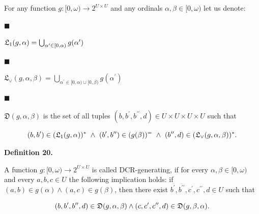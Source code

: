  
 
For any function $g:[0,\omega)\to 2^{U\times U}$ and any ordinals $\alpha,\beta\in[0,\omega)$ let us denote:\par
  
\par\noindent  $\blacksquare$ 
 
$\mathfrak{L}_{1}(g,\alpha)=\bigcup_{\alpha^{\prime}\in[0,\alpha)}g(\alpha^{%
\prime})$\par
 
 
 
\par\noindent  $\blacksquare$ 
 
$\mathfrak{L}_{\vee}(g,\alpha,\beta)=\bigcup_{\alpha^{\prime}\in[0,\alpha)\cup[%
0,\beta)}g(\alpha^{\prime})$\par
 
 
 
\par\noindent  $\blacksquare$ 
 
$\mathfrak{D}(g,\alpha,\beta)$ is the set of all tuples $(b,b^{\prime},b^{\prime\prime},d)\in U\times U\times U\times U$ such that\par
    \[(b,b^{\prime})\in(\mathfrak{L}_{1}(g,\alpha))^{*}\leavevmode\nobreak\ \wedge%
\leavevmode\nobreak\ (b^{\prime},b^{\prime\prime})\in(g(\beta))^{=}\leavevmode%
\nobreak\ \wedge\leavevmode\nobreak\ (b^{\prime\prime},d)\in(\mathfrak{L}_{%
\vee}(g,\alpha,\beta))^{*}.\]    
 
  
 
 
\par\medskip\noindent\textbf{Definition 20.}\par
 
 
A function $g:[0,\omega)\to 2^{U\times U}$ is called DCR-generating, if for every $\alpha,\beta\in[0,\omega)$ and every $a,b,c\in U$ the following implication holds: if $(a,b)\in g(\alpha)\wedge(a,c)\in g(\beta)$, then there exist $b^{\prime},b^{\prime\prime},c^{\prime},c^{\prime\prime},d\in U$ such that\par
    \[(b,b^{\prime},b^{\prime\prime},d)\in\mathfrak{D}(g,\alpha,\beta)\wedge(c,c^{%
\prime},c^{\prime\prime},d)\in\mathfrak{D}(g,\beta,\alpha).\]    
 
